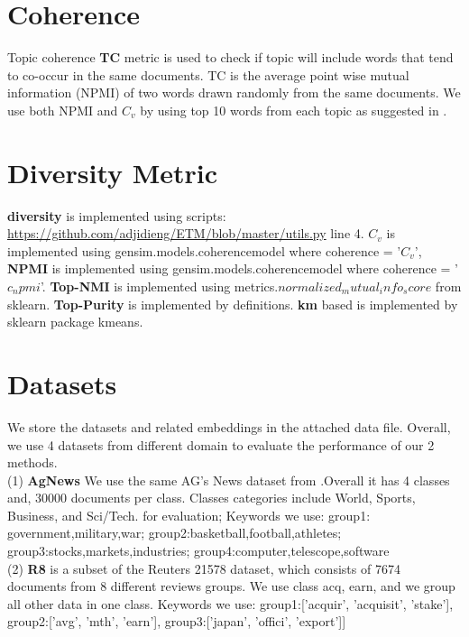 \documentclass[11pt]{article}
\begin{document}
\section{Coherence}

\label{coherence}

Topic coherence \textbf{TC} metric \cite{mimno2011optimizing} is used to check if topic will include words that tend to co-occur in the same documents. TC \cite{lau2014machine} is the average point wise mutual information (NPMI) of two words drawn randomly from the same documents.  We use both NPMI and $C_{v}$\cite{10.1145/2684822.2685324} by using top 10 words from each topic as suggested in \cite{10.1145/2684822.2685324}.  




\section{Diversity Metric}
\label{appendix:metric}
\textbf{diversity} is implemented using scripts: \url{https://github.com/adjidieng/ETM/blob/master/utils.py} line 4. \textbf{$C_{v}$} is implemented using  gensim.models.coherencemodel where coherence = '$C_v$', \textbf{NPMI} is implemented using gensim.models.coherencemodel where coherence = '$c_npmi$'. \textbf{Top-NMI} is implemented using metrics.$normalized_mutual_info_score$ from sklearn. \textbf{Top-Purity} is implemented by definitions. \textbf{km} based is implemented by sklearn package kmeans. 

\section{Datasets}
\label{appendix:dataset}
We store the datasets and related embeddings in the attached data file. 
Overall, we use 4 datasets from different domain to evaluate the performance of our 2 methods.\\ (1) \textbf{AgNews} We use the same AG’s News dataset from \cite{zhang2016characterlevel}.Overall it has 4 classes and, 30000 documents per class. Classes categories include World, Sports, Business, and Sci/Tech. 
for evaluation; 
Keywords we use: 
group1: government,military,war;
group2:basketball,football,athletes;
group3:stocks,markets,industries;
group4:computer,telescope,software
\\
(2) \textbf{R8} is a subset of the Reuters 21578 dataset, which consists of 7674 documents from 8 different reviews groups. We use class acq, earn, and we group all other data in one class. 
Keywords we use:
group1:['acquir', 'acquisit', 'stake'],
group2:['avg', 'mth', 'earn'],
group3:['japan', 'offici', 'export']]
\end{document}
